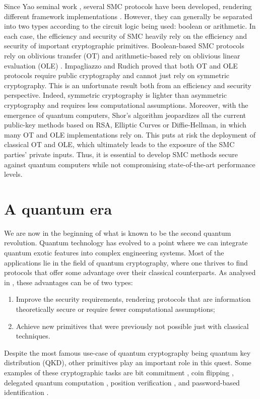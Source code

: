 Since Yao seminal work \cite{Y86}, several SMC protocols have been developed, rendering different framework implementations \cite{Goldreich87, Bendlin11, D12}. However, they can generally be separated into two types according to the circuit logic being used: boolean or arithmetic. In each case, the efficiency and security of SMC heavily rely on the efficiency and security of important cryptographic primitives. Boolean-based SMC protocols rely on oblivious transfer (OT) \cite{K88} and arithmetic-based rely on oblivious linear evaluation (OLE) \cite{DPSZ12}. Impagliazzo and Rudich \cite{IR99} proved that both OT and OLE protocols require public cryptography and cannot just rely on symmetric cryptography. This is an unfortunate result both from an efficiency and security perspective. Indeed, symmetric cryptography is lighter than asymmetric cryptography and requires less computational assumptions. Moreover, with the emergence of quantum computers, Shor’s algorithm \cite{Sho95} jeopardizes all the current public-key methods based on RSA, Elliptic Curves or Diffie-Hellman, in which many OT and OLE implementations rely on. This puts at risk the deployment of classical OT and OLE, which ultimately leads to the exposure of the SMC parties’ private inputs. Thus, it is essential to develop SMC methods secure against quantum computers while not compromising state-of-the-art performance levels.


\section*{A quantum era}

We are now in the beginning of what is known to be
the second quantum revolution. Quantum technology has evolved to a point where we can integrate quantum exotic features into complex engineering systems. Most of the applications lie in the field of quantum cryptography, where one thrives to find protocols that offer some advantage over their classical counterparts. As analysed in \cite{B15, PSAN13}, these advantages can be of two types:

\begin{enumerate}
    \item Improve the security requirements, rendering protocols that are information theoretically secure or require fewer computational assumptions;
    \item Achieve new primitives that were previously not possible just with classical techniques.
\end{enumerate}
Despite the most famous use-case of quantum cryptography being quantum key distribution (QKD), other primitives play an important role in this quest. Some examples of these cryptographic tasks are bit commitment \cite{CK11}, coin flipping \cite{CK09}, delegated quantum computation \cite{BFK09}, position verification \cite{Unr14}, and password-based identification \cite{DFSS14, DFLSS09}. 

